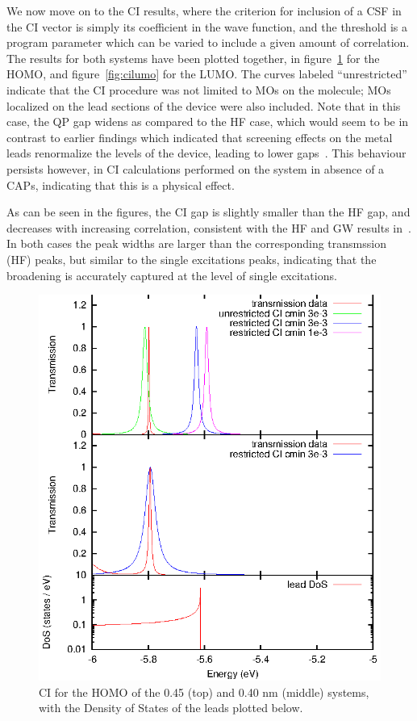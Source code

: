 We now move on to the \ac{CI} results, where the criterion for inclusion of a
\ac{CSF} in the \ac{CI} vector is simply its coefficient in the wave function,
and the threshold is a program parameter which can be varied to include a given
amount of correlation. The results for both systems have been plotted together,
in figure~\ref{fig:cihomo} for the \ac{HOMO}, and figure~\ref{fig:cilumo}
for the \ac{LUMO}. The curves labeled ``unrestricted'' indicate that the \ac{CI}
procedure was not limited to MOs on the molecule; MOs localized on the lead
sections of the device were also included. Note that in this case, the QP gap
widens as compared to the HF case, which would seem to be in contrast to
earlier findings which indicated that screening effects on the metal leads
renormalize the levels of the device, leading to lower
gaps~\cite{thygesen_rubio, thygesen}. This behaviour persists however, in
\ac{CI} calculations performed on the system in absence of a \acp{CAP},
indicating that this is a physical effect.

As can be seen in the figures, the \ac{CI} gap is slightly smaller than the HF
gap, and decreases with increasing correlation, consistent with the HF and GW
results in~\cite{thygesen_rubio, thygesenrubio2010corr}. In both cases the peak
widths are larger than the corresponding transmssion (HF) peaks, but similar
to the single excitations peaks, indicating that the broadening is accurately
captured at the level of single excitations.

\begin{figure}
	\begin{center}
		\includegraphics[width=0.9\linewidth]{figures/cihomo.eps}
	\end{center}
	\caption{CI for the \ac{HOMO} of the 0.45 (top) and 0.40 nm (middle)
                 systems, with the Density of States of the leads plotted
                 below.}
	\label{fig:cihomo}
\end{figure}



